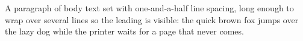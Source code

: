 \documentclass{article}
\begin{document}
A paragraph of body text set with one-and-a-half line spacing, long enough to
wrap over several lines so the leading is visible: the quick brown fox jumps
over the lazy dog while the printer waits for a page that never comes.
\end{document}
